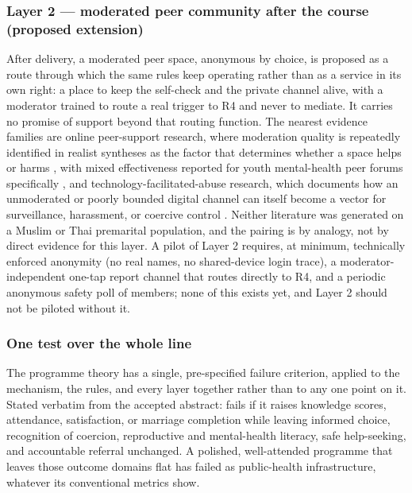 \subsubsection*{Layer 2 --- moderated peer community after the course (proposed extension)}
After delivery, a moderated peer space, anonymous by choice, is proposed as a route through which the
same rules keep operating rather than as a service in its own right: a place to keep the self-check
and the private channel alive, with a moderator trained to route a real trigger to R4 and never to
mediate. It carries no promise of support beyond that routing function. The nearest evidence families
are online peer-support research, where moderation quality is repeatedly identified in realist syntheses
as the factor that determines whether a space helps or harms \cite{ref140,ref144}, with mixed
effectiveness reported for youth mental-health peer forums specifically \cite{ref139}, and
technology-facilitated-abuse
research, which documents how an unmoderated or poorly bounded digital channel can itself become a
vector for surveillance, harassment, or coercive control \cite{ref149,ref150}. Neither literature was
generated on a Muslim or Thai premarital population, and the pairing is by analogy, not by direct
evidence for this layer. A pilot of Layer 2 requires, at minimum, technically enforced anonymity (no
real names, no shared-device login trace), a moderator-independent one-tap report channel that
routes directly to R4, and a periodic anonymous safety poll of members; none of this exists yet, and
Layer 2 should not be piloted without it.

\subsubsection*{One test over the whole line}
The programme theory has a single, pre-specified failure criterion, applied to the mechanism, the
rules, and every layer together rather than to any one point on it. Stated verbatim from the accepted
abstract: \tphe{} fails if it raises knowledge scores, attendance, satisfaction, or marriage completion
while leaving informed choice, recognition of coercion, reproductive and mental-health literacy, safe
help-seeking, and accountable referral unchanged. A polished, well-attended programme that leaves
those outcome domains flat has failed as public-health infrastructure, whatever its conventional
metrics show.

